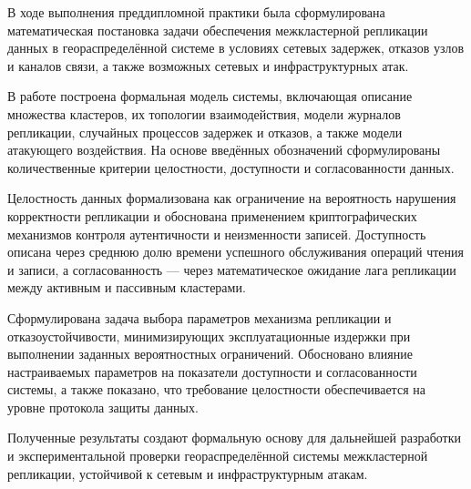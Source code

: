 \conclusion

В ходе выполнения преддипломной практики
была сформулирована математическая постановка задачи
обеспечения межкластерной репликации данных
в геораспределённой системе
в условиях сетевых задержек,
отказов узлов и каналов связи,
а также возможных сетевых и инфраструктурных атак.

В работе построена формальная модель системы,
включающая описание множества кластеров,
их топологии взаимодействия,
модели журналов репликации,
случайных процессов задержек и отказов,
а также модели атакующего воздействия.
На основе введённых обозначений
сформулированы количественные критерии
целостности, доступности и согласованности данных.

Целостность данных формализована
как ограничение на вероятность нарушения корректности репликации
и обоснована применением криптографических механизмов
контроля аутентичности и неизменности записей.
Доступность описана через среднюю долю времени
успешного обслуживания операций чтения и записи,
а согласованность — через математическое ожидание
лага репликации между активным и пассивным кластерами.

Сформулирована задача выбора параметров
механизма репликации и отказоустойчивости,
минимизирующих эксплуатационные издержки
при выполнении заданных вероятностных ограничений.
Обосновано влияние настраиваемых параметров
на показатели доступности и согласованности системы,
а также показано, что требование целостности
обеспечивается на уровне протокола защиты данных.

Полученные результаты создают формальную основу
для дальнейшей разработки и экспериментальной проверки
геораспределённой системы межкластерной репликации,
устойчивой к сетевым и инфраструктурным атакам.
